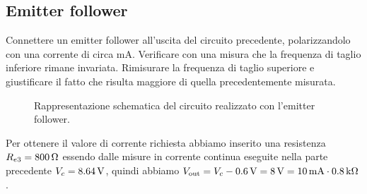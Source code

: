 \documentclass[italian,a4paper]{article}
\begin{document}
\subsection*{Emitter follower}
Connettere un emitter follower all'uscita del circuito precedente,
polarizzandolo con una corrente di circa \unit[10]{mA}. Verificare con
una misura che la frequenza di taglio inferiore rimane invariata.
Rimisurare la frequenza di taglio superiore e giustificare il fatto che
risulta maggiore di quella precedentemente misurata.

\begin{figure}[h]\caption{Rappresentazione schematica del circuito
    realizzato con l'emitter follower.}\label{fig:circuitoemitter}
    \centering
    
\end{figure}

Per ottenere il valore di corrente richiesta abbiamo inserito una
resistenza $R_{e3} = \unit[800]{\ohm}$ essendo dalle misure in corrente
continua eseguite nella parte precedente $V_c = \unit[8.64]{V}$, quindi
 abbiamo $V_{\text{out}} = V_c - \unit[0.6]{V} = \unit[8]{V} =
 \unit[10]{mA}\cdot \unit[0.8]{k\ohm}$.
\end{document}

